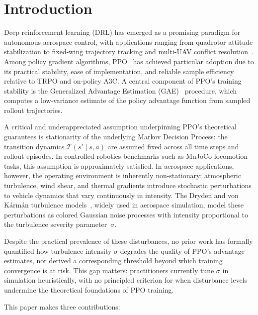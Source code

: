 \documentclass[10pt, conference]{IEEEtran}
\begin{document}
\section{Introduction}

Deep reinforcement learning (DRL) has emerged as a promising paradigm
for autonomous aerospace control, with applications ranging from
quadrotor attitude stabilization to fixed-wing trajectory tracking and
multi-UAV conflict resolution~\cite{koch2019, loquercio2021,
peng2023, wang2019}. Among policy gradient algorithms, PPO~\cite{schulman2017}
has achieved particular adoption due to its practical stability, ease of
implementation, and reliable sample efficiency relative to TRPO and
on-policy A3C. A central component of PPO's training stability is the
Generalized Advantage Estimation (GAE)~\cite{schulman2016gae}
procedure, which computes a low-variance estimate of the policy advantage
function from sampled rollout trajectories.

A critical and underappreciated assumption underpinning PPO's
theoretical guarantees is stationarity of the underlying Markov Decision
Process: the transition dynamics $\mathcal{T}(s'\mid s,a)$ are assumed
fixed across all time steps and rollout episodes. In controlled robotics
benchmarks such as MuJoCo locomotion tasks, this assumption is
approximately satisfied. In aerospace applications, however, the operating
environment is inherently non-stationary: atmospheric turbulence, wind
shear, and thermal gradients introduce stochastic perturbations to vehicle
dynamics that vary continuously in intensity. The Dryden and von
K\'{a}rm\'{a}n turbulence models~\cite{milspec1797}, widely used in
aerospace simulation, model these perturbations as colored Gaussian noise
processes with intensity proportional to the turbulence severity
parameter~$\sigma$.

Despite the practical prevalence of these disturbances, no prior work
has formally quantified how turbulence intensity $\sigma$ degrades the
quality of PPO's advantage estimates, nor derived a corresponding
threshold beyond which training convergence is at risk. This gap matters:
practitioners currently tune $\sigma$ in simulation heuristically, with no
principled criterion for when disturbance levels undermine the theoretical
foundations of PPO training.

This paper makes three contributions:
\end{document}
